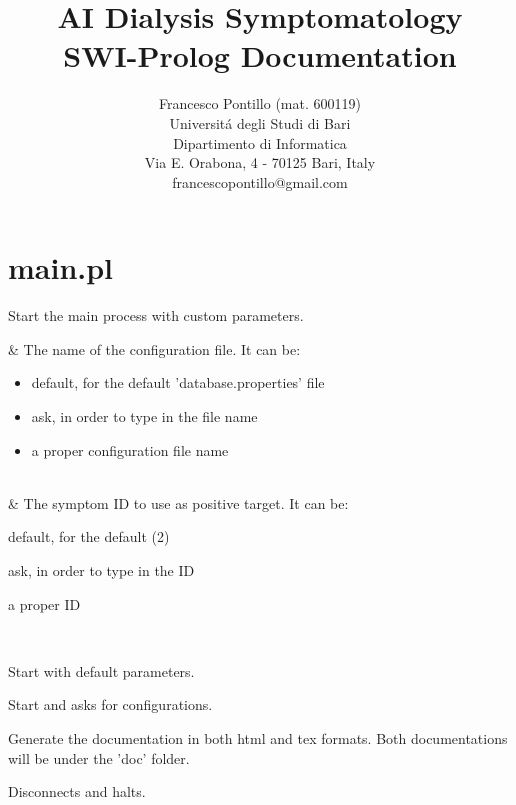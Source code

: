 \documentclass[11pt]{article}
\begin{document}

\title{AI Dialysis Symptomatology \\ \vspace{2 mm} {\large SWI-Prolog Documentation}}

\author{
	Francesco Pontillo (mat. 600119)\\
       Universit\'a degli Studi di Bari\\
       Dipartimento di Informatica\\
       Via E. Orabona, 4 - 70125  Bari, Italy\\
       francescopontillo@gmail.com
}

\date{}

\maketitle

\section{main.pl}

\label{sec:main}

\begin{description}
Start the main process with custom parameters.

\begin{arguments}
 & The name of the configuration file. It can be:

\begin{itemize}
    \item default, for the default 'database.properties' file
    \item ask, in order to type in the file name
    \item a proper configuration file name
\end{itemize}

 \\
 & The symptom ID to use as positive target. It can be:

\begin{shortlist}
    \item default, for the default (2)
    \item ask, in order to type in the ID
    \item a proper ID
\end{shortlist}

 \\
\end{arguments}

Start  with default parameters.

Start  and asks for configurations.

Generate the documentation in both html and tex formats.
Both documentations will be under the 'doc' folder.

Disconnects and halts.
\end{description}
\end{document}
